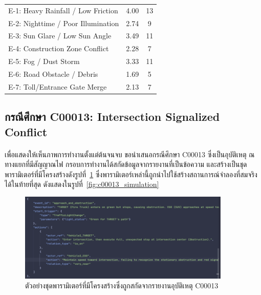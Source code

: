 \begin{table}[htbp]
\begin{tabular}{|l|c|c|}
        \hline
        E-1: Heavy Rainfall / Low Friction & 4.00 & 13 \\
        E-2: Nighttime / Poor Illumination & 2.74 & 9 \\
        E-3: Sun Glare / Low Sun Angle & 3.49 & 11 \\
        E-4: Construction Zone Conflict & 2.28 & 7 \\
        E-5: Fog / Dust Storm & 3.33 & 11 \\
        E-6: Road Obstacle / Debris & 1.69 & 5 \\
        E-7: Toll/Entrance Gate Merge & 2.13 & 7 \\
        \hline
    \end{tabular}
\end{table}

\subsection{กรณีศึกษา C00013: Intersection Signalized Conflict}
\paragraph{}
เพื่อแสดงให้เห็นภาพการทำงานตั้งแต่ต้นจนจบ ขอนำเสนอกรณีศึกษา C00013 ซึ่งเป็นอุบัติเหตุ ณ ทางแยกที่มีสัญญาณไฟ กรอบการทำงานได้สกัดข้อมูลจากรายงานที่เป็นข้อความ และสร้างเป็นชุดพารามิเตอร์ที่มีโครงสร้างดังรูปที่~\ref{fig:c00013_features} ซึ่งพารามิเตอร์เหล่านี้ถูกนำไปใช้สร้างสถานการณ์จำลองที่สมจริงได้ในท้ายที่สุด ดังแสดงในรูปที่~\ref{fig:c00013_simulation}

\begin{figure}[htbp]
    \centering
    \includegraphics[width=0.9\textwidth]{images/c00013_extracted_features}
    \caption{ตัวอย่างชุดพารามิเตอร์ที่มีโครงสร้างซึ่งถูกสกัดจากรายงานอุบัติเหตุ C00013}
    \label{fig:c00013_features}
\end{figure}

